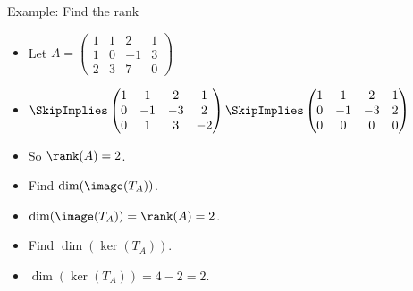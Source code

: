 \documentclass{beamer}
\begin{document}
\begin{frame}{Example: Find the rank}

\begin{itemize}
\item Let $A=
\begin{pmatrix}
1 & 1 & 2 & 1  \\
1 & 0 & -1 & 3  \\
2 & 3 & 7 & 0
\end{pmatrix}
$
\item $
\SkipImplies
\begin{pmatrix}
1 & 1 & 2 & 1 \\
0 & -1 & -3 & 2  \\
0 & 1 & 3 & -2
\end{pmatrix}
\SkipImplies
\begin{pmatrix}
1 & 1 & 2 & 1  \\
0 & -1 & -3 & 2 \\
0 & 0 & 0 & 0
\end{pmatrix}
$
\item So $\rank(A) = 2$.
\item Find $\dim(\image(T_A))$.
\item $\dim(\image(T_A))=\rank(A)=2$.
\item Find $\dim(\ker(T_A))$.
\item $\dim(\ker(T_A)) = 4 - 2 = 2$.
\end{itemize}

\end{frame}

\end{document}
